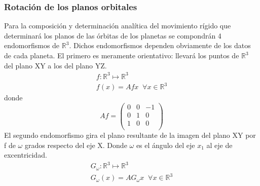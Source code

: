 \documentclass[a4paper, 11pt]{article}
\begin{document}
  \subsubsection{Rotación de los planos orbitales}

  Para la composición y determinación analítica del movimiento rígido que determinará
  los planos de las órbitas de los planetas se compondrán 4 endomorfismos de $\mathbb{R}^3$.
  Dichos endomorfismos dependen obviamente de los datos de cada planeta.
  El primero es meramente orientativo: llevará los puntos de $\mathbb{R}^3$ del plano XY
  a los del plano YZ.
  \begin{align*}
      f:\mathbb{R}^3\longmapsto\mathbb{R}^3 \\
      f(x)=Afx\;\;\forall x \in \mathbb{R}^3
  \end{align*}
  donde \[Af=\left(
  \begin{array}{lcr}
  0& 0 & -1 \\
  0 & 1 & 0 \\
  1 & 0 & 0 \\
  \end{array}
  \right)
  \]
  El segundo endomorfismo gira el plano resultante de la imagen del plano XY por f de $\omega$ grados
  respecto del eje X. Donde $\omega$ es el ángulo del eje $x_{1}$ al eje de excentricidad.
  \begin{align*}
      G_{\omega}:\mathbb{R}^3\longmapsto\mathbb{R}^3\\
      G_{\omega}(x)=AG_{\omega}x\;\;\forall x \in \mathbb{R}^3
  \end{align*}
\end{document}
